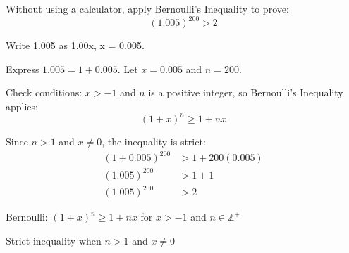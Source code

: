 \begin{problem}
Without using a calculator, apply Bernoulli's Inequality to prove:
\[ (1.005)^{200} > 2 \]
\end{problem}

\begin{hint}
Write 1.005 as 1.00x, x = 0.005.
\end{hint}

\begin{solution}
Express $1.005 = 1 + 0.005$. Let $x = 0.005$ and $n = 200$.

Check conditions: $x > -1$ and $n$ is a positive integer, so Bernoulli's Inequality applies:
\[ (1 + x)^n \geq 1 + nx \]

Since $n > 1$ and $x \neq 0$, the inequality is strict:
\begin{align*}
(1 + 0.005)^{200} &> 1 + 200(0.005) \\
(1.005)^{200} &> 1 + 1 \\
(1.005)^{200} &> 2
\end{align*}
\end{solution}

\begin{takeaways}
\item Bernoulli: $(1+x)^n \geq 1 + nx$ for $x > -1$ and $n \in \mathbb{Z}^+$
\item Strict inequality when $n > 1$ and $x \neq 0$
\end{takeaways}
